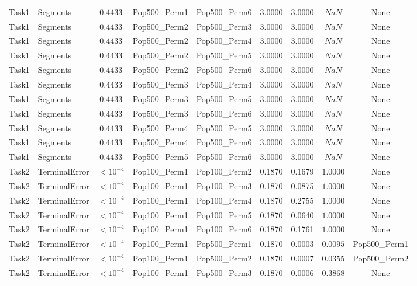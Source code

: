 \documentclass[8pt]{article}
\begin{document}
\begin{longtable}{llccccccc}
Task1 & Segments & $0.4433$ & Pop500\_Perm1 & Pop500\_Perm6 & 3.0000 & 3.0000 & $NaN$ & None \\
Task1 & Segments & $0.4433$ & Pop500\_Perm2 & Pop500\_Perm3 & 3.0000 & 3.0000 & $NaN$ & None \\
Task1 & Segments & $0.4433$ & Pop500\_Perm2 & Pop500\_Perm4 & 3.0000 & 3.0000 & $NaN$ & None \\
Task1 & Segments & $0.4433$ & Pop500\_Perm2 & Pop500\_Perm5 & 3.0000 & 3.0000 & $NaN$ & None \\
Task1 & Segments & $0.4433$ & Pop500\_Perm2 & Pop500\_Perm6 & 3.0000 & 3.0000 & $NaN$ & None \\
Task1 & Segments & $0.4433$ & Pop500\_Perm3 & Pop500\_Perm4 & 3.0000 & 3.0000 & $NaN$ & None \\
Task1 & Segments & $0.4433$ & Pop500\_Perm3 & Pop500\_Perm5 & 3.0000 & 3.0000 & $NaN$ & None \\
Task1 & Segments & $0.4433$ & Pop500\_Perm3 & Pop500\_Perm6 & 3.0000 & 3.0000 & $NaN$ & None \\
Task1 & Segments & $0.4433$ & Pop500\_Perm4 & Pop500\_Perm5 & 3.0000 & 3.0000 & $NaN$ & None \\
Task1 & Segments & $0.4433$ & Pop500\_Perm4 & Pop500\_Perm6 & 3.0000 & 3.0000 & $NaN$ & None \\
Task1 & Segments & $0.4433$ & Pop500\_Perm5 & Pop500\_Perm6 & 3.0000 & 3.0000 & $NaN$ & None \\
Task2 & TerminalError & $< 10^{-4}$ & Pop100\_Perm1 & Pop100\_Perm2 & 0.1870 & 0.1679 & $1.0000$ & None \\
Task2 & TerminalError & $< 10^{-4}$ & Pop100\_Perm1 & Pop100\_Perm3 & 0.1870 & 0.0875 & $1.0000$ & None \\
Task2 & TerminalError & $< 10^{-4}$ & Pop100\_Perm1 & Pop100\_Perm4 & 0.1870 & 0.2755 & $1.0000$ & None \\
Task2 & TerminalError & $< 10^{-4}$ & Pop100\_Perm1 & Pop100\_Perm5 & 0.1870 & 0.0640 & $1.0000$ & None \\
Task2 & TerminalError & $< 10^{-4}$ & Pop100\_Perm1 & Pop100\_Perm6 & 0.1870 & 0.1761 & $1.0000$ & None \\
Task2 & TerminalError & $< 10^{-4}$ & Pop100\_Perm1 & Pop500\_Perm1 & 0.1870 & 0.0003 & $0.0095$ & Pop500\_Perm1 \\
Task2 & TerminalError & $< 10^{-4}$ & Pop100\_Perm1 & Pop500\_Perm2 & 0.1870 & 0.0007 & $0.0355$ & Pop500\_Perm2 \\
Task2 & TerminalError & $< 10^{-4}$ & Pop100\_Perm1 & Pop500\_Perm3 & 0.1870 & 0.0006 & $0.3868$ & None \\

\end{longtable}
\end{document}
